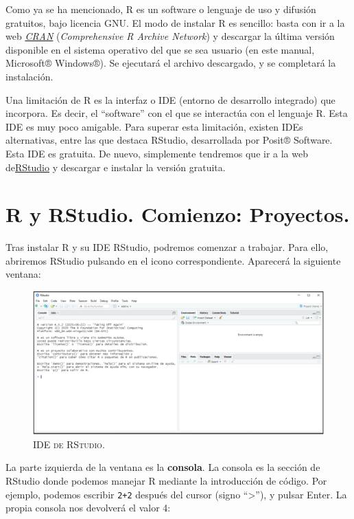\documentclass[
]{book}
\let\Oldincludegraphics\includegraphics
\renewcommand{\includegraphics}[2][]{%
  \Oldincludegraphics[#1]{#2}%
}
\begin{document}
Como ya se ha mencionado, R es un software o lenguaje de uso y difusión gratuitos, bajo licencia GNU. El modo de instalar R es sencillo: basta con ir a la web \href{https://cran.r-project.org/}{\emph{CRAN}} (\emph{Comprehensive R Archive Network}) y descargar la última versión disponible en el sistema operativo del que se sea usuario (en este manual, Microsoft® Windows®). Se ejecutará el archivo descargado, y se completará la instalación.

Una limitación de R es la interfaz o IDE (entorno de desarrollo integrado) que incorpora. Es decir, el ``software'' con el que se interactúa con el lenguaje R. Esta IDE es muy poco amigable. Para superar esta limitación, existen IDEs alternativas, entre las que destaca RStudio, desarrollada por Posit® Software. Esta IDE es gratuita. De nuevo, simplemente tendremos que ir a la web de\href{https://posit.co/download/rstudio-desktop/}{RStudio} y descargar e instalar la versión gratuita.

\section{R y RStudio. Comienzo: Proyectos.}\label{r-y-rstudio.-comienzo-proyectos.}

Tras instalar R y su IDE RStudio, podremos comenzar a trabajar. Para ello, abriremos RStudio pulsando en el icono correspondiente. Aparecerá la siguiente ventana:

\begin{figure}
\centering
\includegraphics[width=5.20833in,height=\textheight]{figuras/Imagen1_01.png}
\caption{\textsc{IDE de RStudio.}}
\end{figure}

La parte izquierda de la ventana es la \textbf{consola}. La consola es la sección de RStudio donde podemos manejar R mediante la introducción de código. Por ejemplo, podemos escribir \texttt{2+2} después del cursor (signo ``\textgreater{}''), y pulsar Enter. La propia consola nos devolverá el valor 4:
\end{document}
